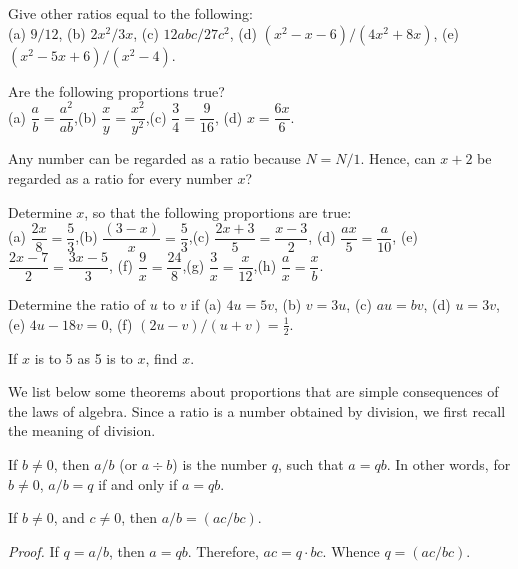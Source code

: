 \documentclass[11pt]{book}
\theoremstyle{bkplain}
\theoremstyle{XIplainnote}
\theoremstyle{bkplain}
\theoremstyle{bkplain}
\begin{document}
\begin{exercisecols}
\begin{exlist}
\item Give other ratios equal to the following:\\
      (a) $9/12$, (b) $2x^2/3x$, (c) $12abc/27c^2$, (d) $(x^2-x-6)/(4x^2+8x)$,
      (e) $(x^2-5x+6)/(x^2-4)$.
\item Are the following proportions true?\\
      (a) $\dfrac{a}{b} = \dfrac{a^2}{ab}$,\quad (b) $\dfrac{x}{y} =
      \dfrac{x^2}{y^2}$,\quad (c) $\dfrac{3}{4} = \dfrac{9}{16}$,\quad
      (d) $x = \dfrac{6x}{6}$.
\item Any number can be regarded as a ratio because $N = N/1$. Hence, can $x + 2$
      be regarded as a ratio for every number $x$?
\item Determine $x$, so that the following proportions are true:\\
      (a) $\dfrac{2x}{8} = \dfrac{5}{3}$,\quad (b) $\dfrac{(3-x)}{x} =
      \dfrac{5}{3}$,\quad (c) $\dfrac{2x+3}{5} = \dfrac{x-3}{2}$,\quad
      (d) $\dfrac{ax}{5} = \dfrac{a}{10}$,\quad
      \stex(e) $\dfrac{2x-7}{2} = \dfrac{3x-5}{3}$,\quad
      (f) $\dfrac{9}{x} = \dfrac{24}{8}$,\quad (g) $\dfrac{3}{x} =
      \dfrac{x}{12}$,\quad (h) $\dfrac{a}{x} = \dfrac{x}{b}$.
\item Determine the ratio of $u$ to $v$ if (a) $4u = 5v$, (b) $v = 3u$,
      (c) $au = bv$, (d) $u = 3v$, (e) $4u - 18v = 0$,
      (f) $(2u - v)/(u + v) = \frac{1}{2}$.
\item If $x$ is to 5 as 5 is to $x$, find $x$.
\end{exlist}
\end{exercisecols}

We list below some theorems about proportions that are simple consequences of the
laws of algebra. Since a ratio is a number obtained by division, we first recall
the meaning of division.

\begin{definition}
If $b \neq 0$, then $a/b$ (or $a \div b$) is the number $q$, such that $a = qb$.
In other words, for $b \neq 0$, $a/b = q$ if and only if $a = qb$.
\end{definition}

\begin{theorem}
If $b \neq 0$, and $c \neq 0$, then $a/b = (ac/bc)$.
\end{theorem}

\noindent\emph{Proof.} If $q = a/b$, then $a = qb$. Therefore, $ac = q \cdot bc$.
Whence $q = (ac/bc)$.
\end{document}
